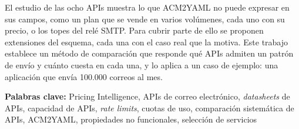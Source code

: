 El estudio de las ocho APIs muestra lo que ACM2YAML no puede expresar en sus campos, como un
plan que se vende en varios volúmenes, cada uno con su precio, o los topes del relé SMTP. Para
cubrir parte de ello se proponen extensiones del esquema, cada una con el caso real que la motiva.
Este trabajo establece un método de comparación que responde qué APIs admiten un patrón de
envío y cuánto cuesta en cada una, y lo aplica a un caso de ejemplo: una aplicación que envía
100.000 correos al mes.

\vspace{.5cm}
{\raggedright\noindent\textbf{Palabras clave:} Pricing Intelligence, APIs de correo electrónico, \textit{datasheets} de APIs, capacidad de APIs,
\textit{rate limits}, cuotas de uso, comparación sistemática de APIs, ACM2YAML,
propiedades no funcionales, selección de servicios\par}
